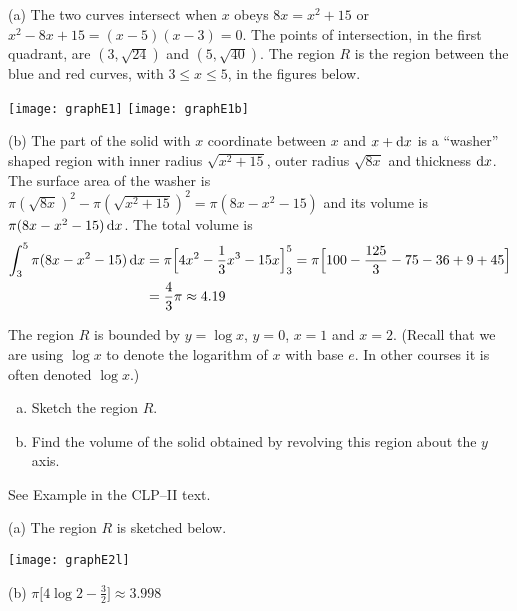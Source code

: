 \begin{solution} (a)
The two curves intersect when $x$ obeys $8x=x^2+15$
or $x^2-8x+15=(x-5)(x-3)=0$. The points of intersection, in the first quadrant,
are $(3,\sqrt{24})$ and $(5, \sqrt{40})$. The region $R$ is the region
between the blue and red curves, with $3\le x\le 5$,  in the figures below.

\begin{center}
       \texttt{[image: graphE1]}\qquad
       \texttt{[image: graphE1b]}
\end{center}

\item{}(b) The part of the solid with $x$ coordinate between $x$ and $x+\mathrm{d}x$
is a ``washer'' shaped region with inner radius $\sqrt{x^2+15}$, outer
radius $\sqrt{8x}$ and thickness $\mathrm{d}x$. The surface area of the washer is
$\pi(\sqrt{8x})^2 -\pi(\sqrt{x^2+15})^2=\pi(8x-x^2-15)$ and its volume is
$\pi(8x-x^2-15)\,\mathrm{d}x$. The total volume is
\begin{align*}
\int_3^5 \pi(8x-x^2-15)\,\mathrm{d}x
&=\pi\Big[4x^2-\frac{1}{3}x^3-15 x\Big]_3^5
=\pi\Big[100-\frac{125}{3}-75-36+9+45\Big] \\
&=\frac{4}{3}\pi\approx 4.19
\end{align*}

\end{solution}


\begin{Mquestion}[1996D] %
 The region $R$ is bounded by $y=\log x$, $y=0$, $x=1$ and $x=2$.
(Recall that we are using $\log x$ to denote the logarithm of $x$ with
base $e$. In other courses it is often denoted $\log x$.)
\begin{enumerate}[(a)]
\item
Sketch the region $R$.
\item
Find the volume of the solid obtained by revolving this region  about the $y$ axis.
\end{enumerate}
\end{Mquestion}

\begin{hint}
See Example  in the
CLP--II text.
\end{hint}

\begin{answer} (a)
The region $R$ is sketched below.

\begin{center}
       \texttt{[image: graphE2l]}
\end{center}

\noindent (b) $\pi\Big[4\log 2 - \frac{3}{2}\Big] \approx 3.998$
\end{answer}

